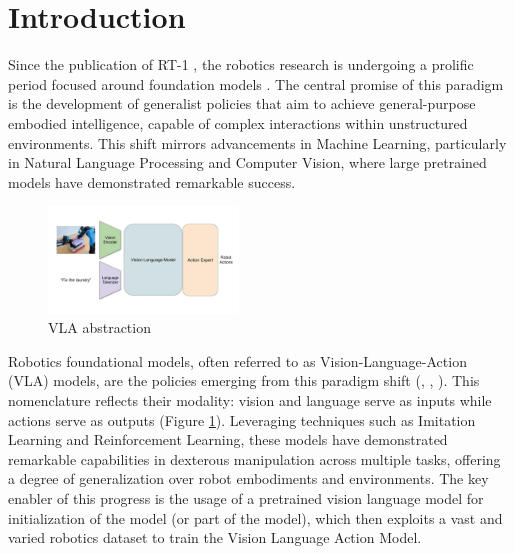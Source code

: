 \section{Introduction}

Since the publication of RT-1 \cite{RT-1}, the robotics research is undergoing a prolific period focused around foundation models \cite{FoundationalModels}. The central promise of this paradigm is the development of generalist policies that aim to achieve general-purpose embodied intelligence, capable of complex interactions within unstructured environments. This shift mirrors advancements in Machine Learning, particularly in Natural Language Processing and Computer Vision, where large pretrained models have demonstrated remarkable success.

\begin{figure}
    \vspace{-15pt}
    \centering
    \includegraphics[width=0.45\textwidth]{images/vla.jpg}
    \caption{VLA abstraction}
    \label{fig:vla_abstraction}
    \vspace{-15pt}
\end{figure}

Robotics foundational models, often referred to as Vision-Language-Action (VLA) models, are the policies 
emerging from this paradigm shift (\cite{OpenVLA}, \cite{Gr00tN1}, \cite{pi_zero}). This nomenclature reflects their modality: vision and language serve as inputs while 
actions serve as outputs (Figure \ref{fig:vla_abstraction}). Leveraging techniques such as Imitation Learning and 
Reinforcement Learning, these models have demonstrated remarkable capabilities in dexterous manipulation across multiple tasks, 
offering a degree of generalization over robot embodiments and environments. The key enabler of this progress is the 
usage of a pretrained vision language model for initialization of the model (or part of the model), which then 
exploits a vast and varied robotics dataset to train the Vision Language Action Model.

